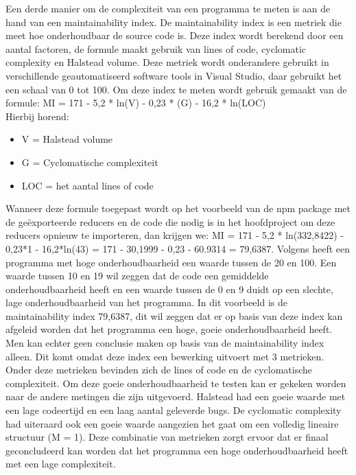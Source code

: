 Een derde manier om de complexiteit van een programma te meten is aan de hand van een maintainability index. De maintainability index is een metriek  die meet hoe onderhoudbaar de source code is. Deze index wordt berekend door een aantal factoren, de formule maakt gebruik van lines of code, cyclomatic complexity en Halstead volume. Deze metriek wordt onderandere gebruikt in verschillende geautomatiseerd software tools in Visual Studio, daar gebruikt het een schaal van 0 tot 100.
Om deze index te meten wordt gebruik gemaakt van de formule: \newline MI = 171 - 5,2 * ln(V) - 0,23 * (G) - 16,2 * ln(LOC) \\
Hierbij horend: 
\begin{itemize}
	\item V = Halstead volume
	\item G = Cyclomatische complexiteit
	\item LOC = het aantal lines of code
\end{itemize}
\autocite{maintainability01}\newline\newline
Wanneer deze formule toegepast wordt op het voorbeeld van de npm package met de geëxporteerde reducers en de code die nodig is in het hoofdproject om deze reducers opnieuw te importeren, dan krijgen we: \newline
MI = 171 - 5,2 * ln(332,8422) - 0,23*1 - 16,2*ln(43) = 171 - 30,1999 - 0,23 - 60.9314 = 79,6387. \newline
Volgens \textcite{maintainability02} heeft een programma met hoge onderhoudbaarheid een waarde tussen de 20 en 100. Een waarde tussen 10 en 19 wil zeggen dat de code een gemiddelde onderhoudbaarheid heeft en een waarde tussen de 0 en 9 duidt op een slechte, lage onderhoudbaarheid van het programma. In dit voorbeeld is de maintainability index 79,6387, dit wil zeggen dat er op basis van deze index kan afgeleid worden dat het programma een hoge, goeie onderhoudbaarheid heeft. Men kan echter geen conclusie maken op basis van de maintainability index alleen. Dit komt omdat deze index een bewerking uitvoert met 3 metrieken. Onder deze metrieken bevinden zich de lines of code en de cyclomatische complexiteit. Om deze goeie onderhoudbaarheid te testen kan er gekeken worden naar de andere metingen die zijn uitgevoerd.  Halstead had een goeie waarde met een lage codeertijd en een laag aantal geleverde bugs. De cyclomatic complexity had uiteraard ook een goeie waarde aangezien het gaat om een volledig lineaire structuur (M = 1). Deze combinatie van metrieken zorgt ervoor dat er finaal geconcludeerd kan worden dat het programma een hoge onderhoudbaarheid heeft met een lage complexiteit. 

